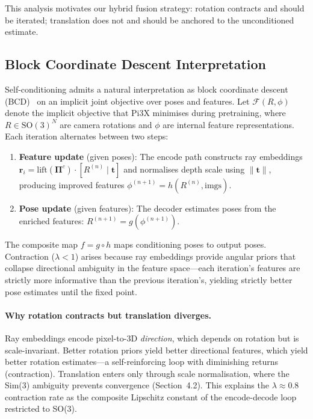 This analysis motivates our hybrid fusion strategy: rotation contracts and should be iterated; translation does not and should be anchored to the unconditioned estimate.

\subsection{Block Coordinate Descent Interpretation}
\label{sec:bcd}

Self-conditioning admits a natural interpretation as block coordinate descent (BCD)~\cite{wright2015} on an implicit joint objective over poses and features. Let $\mathcal{F}(R, \phi)$ denote the implicit objective that Pi3X minimises during pretraining, where $R \in \text{SO}(3)^N$ are camera rotations and $\phi$ are internal feature representations. Each iteration alternates between two steps:
\begin{enumerate}
    \item \textbf{Feature update} (given poses): The encode path constructs ray embeddings $\mathbf{r}_{i} = \text{lift}(\boldsymbol{\Pi}^c) \cdot [R^{(n)} \mid \mathbf{t}]$ and normalises depth scale using $\|\mathbf{t}\|$, producing improved features $\phi^{(n+1)} = h(R^{(n)}, \text{imgs})$.
    \item \textbf{Pose update} (given features): The decoder estimates poses from the enriched features: $R^{(n+1)} = g(\phi^{(n+1)})$.
\end{enumerate}

The composite map $f = g \circ h$ maps conditioning poses to output poses. Contraction ($\lambda < 1$) arises because ray embeddings provide angular priors that collapse directional ambiguity in the feature space---each iteration's features are strictly more informative than the previous iteration's, yielding strictly better pose estimates until the fixed point.

\paragraph{Why rotation contracts but translation diverges.} Ray embeddings encode pixel-to-3D \emph{direction}, which depends on rotation but is scale-invariant. Better rotation priors yield better directional features, which yield better rotation estimates---a self-reinforcing loop with diminishing returns (contraction). Translation enters only through scale normalisation, where the Sim(3) ambiguity prevents convergence (Section~4.2). This explains the $\lambda \approx 0.8$ contraction rate as the composite Lipschitz constant of the encode-decode loop restricted to SO(3).

